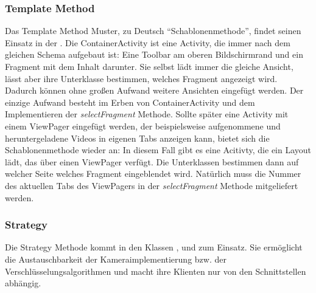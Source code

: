 \subsubsection{Template Method}
Das Template Method Muster, zu Deutsch ``Schablonenmethode'', findet seinen Einsatz in der . Die ContainerActivity ist eine Activity, die immer nach dem gleichen Schema aufgebaut ist: Eine Toolbar am oberen Bildschirmrand und ein Fragment mit dem Inhalt darunter. Sie selbst lädt immer die gleiche Ansicht, lässt aber ihre Unterklasse bestimmen, welches Fragment angezeigt wird. Dadurch können ohne großen Aufwand weitere Ansichten eingefügt werden. Der einzige Aufwand besteht im Erben von ContainerActivity und dem Implementieren der \textit{selectFragment} Methode.\newline
Sollte später eine Activity mit einem ViewPager eingefügt werden, der beispielsweise aufgenommene und heruntergeladene Videos in eigenen Tabs anzeigen kann, bietet sich die Schablonenmethode wieder an: In diesem Fall gibt es eine Acitivty, die ein Layout lädt, das über einen ViewPager verfügt. Die Unterklassen bestimmen dann auf welcher Seite welches Fragment eingeblendet wird. Natürlich muss die Nummer des aktuellen Tabs des ViewPagers in der \textit{selectFragment} Methode mitgeliefert werden.

\subsubsection{Strategy}
Die Strategy Methode kommt in den Klassen ,  und   zum Einsatz. Sie ermöglicht die Austauschbarkeit der Kameraimplementierung bzw. der Verschlüsselungsalgorithmen und macht ihre Klienten nur von den Schnittstellen abhängig.
\newpage
